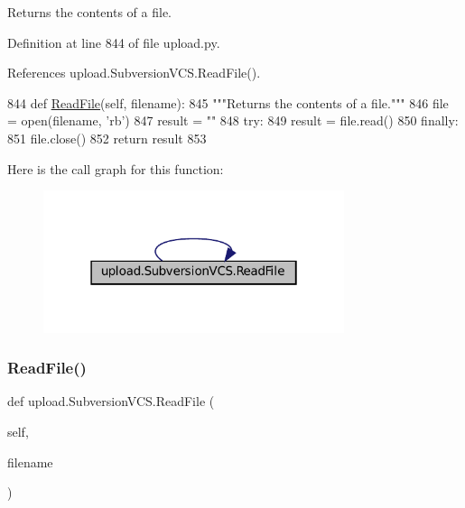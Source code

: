 \begin{DoxyVerb}Returns the contents of a file.\end{DoxyVerb}
 

Definition at line 844 of file upload.\+py.



References upload.\+Subversion\+V\+C\+S.\+Read\+File().


\begin{DoxyCode}
844   \textcolor{keyword}{def }\hyperlink{namespacecpp_1_1utils_a4258aa53673d101d6f57320ec9a3c3a2}{ReadFile}(self, filename):
845     \textcolor{stringliteral}{"""Returns the contents of a file."""}
846     file = open(filename, \textcolor{stringliteral}{'rb'})
847     result = \textcolor{stringliteral}{""}
848     \textcolor{keywordflow}{try}:
849       result = file.read()
850     \textcolor{keywordflow}{finally}:
851       file.close()
852     \textcolor{keywordflow}{return} result
853 
\end{DoxyCode}
Here is the call graph for this function\+:
\nopagebreak
\begin{figure}[H]
\begin{center}
\leavevmode
\includegraphics[width=250pt]{classupload_1_1SubversionVCS_a340d269b74386ac863636f6b0683d9f4_cgraph}
\end{center}
\end{figure}
\mbox{\label{classupload_1_1SubversionVCS_a340d269b74386ac863636f6b0683d9f4}} 
\subsubsection{\texorpdfstring{Read\+File()}{ReadFile()}\hspace{0.1cm}{\footnotesize\ttfamily [2/2]}}
{\footnotesize\ttfamily def upload.\+Subversion\+V\+C\+S.\+Read\+File (\begin{DoxyParamCaption}\item[{}]{self,  }\item[{}]{filename }\end{DoxyParamCaption})}

